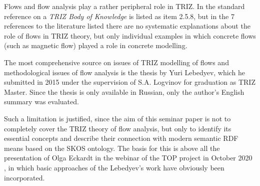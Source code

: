 \documentclass[a4paper,11pt]{article}
\begin{document}
    Flows and flow analysis play a rather peripheral role in TRIZ.  In the
    standard reference \cite{Petrov2007} on a \emph{TRIZ Body of Knowledge} is
    listed as item 2.5.8, but in the 7 references to the literature listed there
    are no systematic explanations about the role of flows in TRIZ theory, but
    only individual examples in which concrete flows (such as magnetic flow)
    played a role in concrete modelling.

    The most comprehensive source on issues of TRIZ modelling of flows and
    methodological issues of flow analysis is the thesis \cite{Lebedyev2011} by
    Yuri Lebedyev, which he submitted in 2015 under the supervision of S.A. 
    Logvinov for graduation as TRIZ Master. Since the thesis is only available in
    Russian, only the author's English summary was evaluated.

    Such a limitation is justified, since the aim of this seminar paper is not to
    completely cover the TRIZ theory of flow analysis, but only to identify its
    essential concepts and describe their connection with modern semantic RDF
    means based on the SKOS ontology. The basis for this is above all the
    presentation of Olga Eckardt in the webinar of the TOP project in October 2020
    \cite{Eckardt2020}, in which basic approaches of the Lebedyev's work have
    obviously been incorporated.
\end{document}

